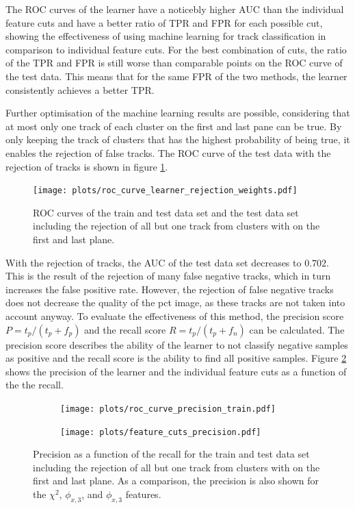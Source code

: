 The ROC curves of the learner have a noticebly higher AUC than the individual feature cuts and have a better ratio of TPR and FPR for each possible cut, showing the effectiveness
of using machine learning for track classification in comparison to individual feature cuts. For the best combination of cuts, the ratio of the TPR and FPR is still worse than
comparable points on the ROC curve of the test data. This means that for the same FPR of the two methods, the learner consistently achieves a better TPR.

Further optimisation of the machine learning results are possible, considering that at most only one track of each cluster
on the first and last pane can be true. By only keeping the track of clusters that has the highest probability of being true, it enables the rejection of
false tracks. The ROC curve of the test data with the rejection of tracks is shown in figure \ref{fig:rejection}.


\begin{figure}
  \centering
  \texttt{[image: plots/roc\_curve\_learner\_rejection\_weights.pdf]}
  \caption{ROC curves of the train and test data set and the test data set including the rejection of all but one track from clusters with on the first and last plane.}
  \label{fig:rejection}
\end{figure}

With the rejection of tracks, the AUC of the test data set decreases to $0.702$. This is the result of the rejection of many false negative tracks, which in turn increases
the false positive rate. However, the rejection of false negative tracks does not decrease the quality of the pct image, as these tracks are not taken into account anyway.
To evaluate the effectiveness of this method, the precision score $P=t_p/(t_p + f_p)$ and the recall score $R=t_p/(t_p + f_n)$ can be calculated. The precision
score describes the ability of the learner to not classify negative samples as positive and the recall score is the ability to find all positive samples.
Figure \ref{fig:precision} shows the precision of the learner and the individual feature cuts as a function of the the recall.

\begin{figure}
  \hspace{-2.5cm}
  \begin{subfigure}{0.62\textwidth}
      \centering
      \texttt{[image: plots/roc\_curve\_precision\_train.pdf]}
  \end{subfigure}
  \begin{subfigure}{0.62\textwidth}
      \hspace{0.95cm}
      \texttt{[image: plots/feature\_cuts\_precision.pdf]}
  \end{subfigure}
  \caption{Precision as a function of the recall for the train and test data set including the rejection of all but one track from clusters with on the first and last
           plane. As a comparison, the precision is also shown for the $\chi^2$, $\phi_{x,3}$, and $\phi_{x,3}$ features.}
  \label{fig:precision}
\end{figure}

